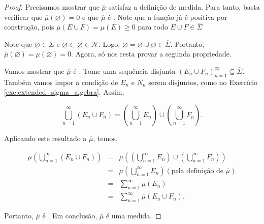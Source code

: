 \begin{proof}
    Precisamos mostrar que $\overline{\mu}$ satisfaz a definição de medida. Para tanto, basta verificar que $\overline{\mu}(\varnothing)=0$ e que $\overline{\mu}$ é . Note que a função já é positiva por construção, pois $\overline{\mu}(E\cup F)=\mu(E)\geq 0$ para todo $E\cup F\in\overline{\Sigma}$

    Note que $\varnothing\in\Sigma$ e $\varnothing\subset\varnothing\in\mathcal{N}$. Logo, $\varnothing=\varnothing\cup\varnothing\in\overline{\Sigma}$. Portanto, $\overline{\mu}(\varnothing)=\mu(\varnothing)=0$. Agora, só nos resta provar a segunda propriedade.

    Vamos mostrar que $\overline{\mu}$ é . Tome uma sequência disjunta $(E_n\cup F_n)_{n=1}^{\infty}\subseteq \overline{\Sigma}$. Também vamos impor a condição de $E_n$ e $N_n$ serem disjuntos, como no Exercício \ref{exe:extended_sigma_algebra}. Assim,

    \begin{equation*}
        \bigcup_{n=1}^{\infty} \left(E_n\cup F_n\right) = \left(\bigcup_{n=1}^{\infty}E_n\right) \cup \left(\bigcup_{n=1}^{\infty}F_n\right).
    \end{equation*}

    Aplicando este resultado a $\overline{\mu}$, temos,

    \begin{eqnarray*}
        \overline{\mu}\left(\bigcup_{n=1}^{\infty} \left(E_n\cup F_n\right)\right)
        &=& \overline{\mu}\left(\left(\bigcup_{n=1}^{\infty}E_n\right) \cup \left(\bigcup_{n=1}^{\infty}F_n\right)\right)\\
        &=& \mu\left(\bigcup_{n=1}^{\infty}E_n\right) (\text{pela definição de } \overline{\mu})\\
        &=& \sum_{n=1}^{\infty} \mu(E_n)\\
        &=& \sum_{n=1}^{\infty} \overline{\mu}(E_n\cup F_n).
    \end{eqnarray*}

    Portanto, $\overline{\mu}$ é . Em conclusão, $\overline{\mu}$ é uma medida.
\end{proof}